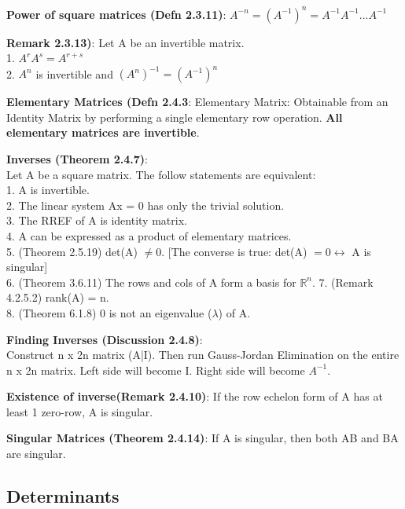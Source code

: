 \documentclass[a4paper,landscape]{article}
\newcommand{\rntopic}[1]{\vspace{-2.0em}\subsection*{#1}\vspace{-1.0em}}
\newcommand{\rnname}[1]{\textbf{#1}}
\begin{document}
\begin{multicols*}{4}
\begin{flatitemize}
\item \rnname{Power of square matrices (Defn 2.3.11)}: $A^{-n} = (A^{-1})^n = A^{-1}A^{-1}...A^{-1}$
\item \rnname{Remark 2.3.13)}: Let A be an invertible matrix.\\
1. $A^rA^s = A^{r+s}$ \\
2. $A^n$ is invertible and $(A^n)^{-1} = (A^{-1})^n$

\item \rnname{Elementary Matrices (Defn 2.4.3}: Elementary Matrix: Obtainable from an Identity Matrix by performing a single elementary row operation. \textbf{All elementary matrices are invertible}.

\item \rnname{Inverses (Theorem 2.4.7)}:\\ Let A be a square matrix. The follow statements are equivalent:\\
1. A is invertible.\\
2. The linear system Ax = 0 has only the trivial solution. \\
3. The RREF of A is identity matrix.\\
4. A can be expressed as a product of elementary matrices. \\
5. (Theorem 2.5.19) det(A) $\neq 0$. [The converse is true: det(A) $ = 0 \leftrightarrow$ A is singular] \\
6. (Theorem 3.6.11) The rows and cols of A form a basis for $\mathbb{R}^n$.
7. (Remark 4.2.5.2) rank(A) = n.\\
8. (Theorem 6.1.8) 0 is not an eigenvalue ($\lambda$) of A.

\item \rnname{Finding Inverses (Discussion 2.4.8)}:\\ Construct n x 2n matrix (A|I). Then run Gauss-Jordan Elimination on the entire n x 2n matrix. Left side will become I. Right side will become $A^{-1}$.\\

\item \rnname{Existence of inverse(Remark 2.4.10)}: If the row echelon form of A has at least 1 zero-row, A is singular. 
\item \rnname{Singular Matrices (Theorem 2.4.14)}: If A is singular, then both AB and BA are singular. 


\end{flatitemize}

\rntopic{Determinants}


\end{multicols*}
\end{document}
